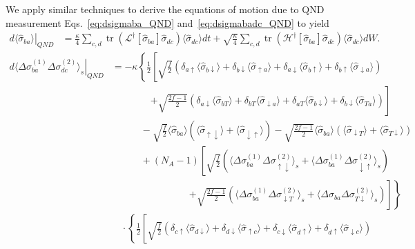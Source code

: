 \documentclass[preprint,aps,pra,onecolumn,superscriptaddress]{revtex4-1} %
\DeclareMathOperator{\tr}{tr}
\newcommand{\nn}{\nonumber}
\newcommand{\expect}[1]{\big\langle #1 \big\rangle}
\begin{document}
\begin{appendix}
We apply similar techniques to derive the equations of motion due to QND measurement Eqs.~\eqref{eq:dsigmaba_QND} and~\eqref{eq:dsigmabadc_QND} to yield
\begin{align}\label{eq:dsigmaba_QND_expand}
\left.d\expect{\hat{\sigma}_{ba}}\right|_{QND} &=\frac{\kappa}{4}\sum_{c,d}\tr\left(\mathcal{L}^\dagger\left[\hat{\sigma}_{ba} \right]\hat{\sigma}_{dc}\right) \expect{\hat{\sigma}_{dc}}dt + \sqrt{\frac{\kappa}{4}}\sum_{c,d}\tr\left(\mathcal{H}^\dagger\left[\hat{\sigma}_{ba} \right]\hat{\sigma}_{dc}\right) \expect{\hat{\sigma}_{dc}}dW .
\end{align}
\begin{align}
\left.d\expect{\!\Delta \sigma_{ba}^{(\!1\!)}\! \Delta \sigma_{dc}^{(\!2\!)}}_s \right|_{QND} 
&\!\!= -\kappa\left\{\frac{1}{2}\left[ \sqrt{\frac{f}{2}}\left(\delta_{a\uparrow}\expect{\hat{\sigma}_{b\downarrow}}+ \delta_{b\downarrow}\expect{\hat{\sigma}_{\uparrow a}}+\delta_{a\downarrow}\expect{\hat{\sigma}_{b\uparrow}} +\delta_{b\uparrow}\expect{\hat{\sigma}_{\downarrow a} } \right)\right.\right.\nn\\
&\quad\quad\quad\quad\left. +\sqrt{\frac{2f-1}{2}}\left(\delta_{a\downarrow}\expect{\hat{\sigma}_{bT}} + \delta_{bT}\expect{\hat{\sigma}_{\downarrow a} }+\delta_{aT}\expect{\hat{\sigma}_{b\downarrow} } +\delta_{b\downarrow}\expect{\hat{\sigma}_{Ta} } \right)\right] \nn\\
&\quad\quad\quad -\sqrt{\frac{f}{2}}\expect{\hat{\sigma}_{ba} }\left(\expect{\hat{\sigma}_{\uparrow\downarrow} }+\expect{\hat{\sigma}_{\downarrow\uparrow} } \right) -\sqrt{\frac{2f-1}{2}} \expect{\hat{\sigma}_{ba}}\left(\expect{\hat{\sigma}_{\downarrow T}}+\expect{\hat{\sigma}_{T\downarrow}} \right)\nn\\ &\quad\quad\quad+(N_A-1)\left[\sqrt{\frac{f}{2}}\left(\expect{\Delta \sigma^{(1)}_{ba}  \Delta\sigma_{\uparrow\downarrow}^{(2)}}_s \!+\!\expect{\Delta\sigma_{ba}^{(1)}\Delta\sigma_{\downarrow\uparrow}^{(2)}}_s\right)\right.\nn\\
&\quad\quad\quad\quad\quad\quad\quad\quad\left.\left. + \sqrt{\frac{2f\!-\! 1}{2}}\left(\expect{\Delta \sigma^{(1)}_{ba}\Delta \sigma_{\downarrow T}^{(2)}}_s \!+\! \expect{\Delta\sigma_{ba}\Delta\sigma_{T\downarrow}^{(2)}}_s\right)\right]  \right\}\nn\\
&\quad\cdot\left\{ \frac{1}{2}\left[ \sqrt{\frac{f}{2}}\left(\delta_{c\uparrow}\expect{\hat{\sigma}_{d\downarrow}}+ \delta_{d\downarrow}\expect{\hat{\sigma}_{\uparrow c}}+\delta_{c\downarrow}\expect{\hat{\sigma}_{d\uparrow}} +\delta_{d\uparrow}\expect{\hat{\sigma}_{\downarrow c} } \right)\right.\right.\nn\\

\end{align}
\end{appendix}
\end{document}
